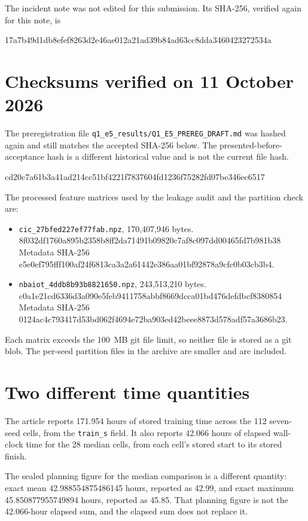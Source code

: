 \documentclass[11pt]{article}
\begin{document}
The incident note was not edited for this submission. Its SHA-256, verified again for this note, is

{\footnotesize\ttfamily 17a7b49d1db8efef8263d2e46ae012a21ad39b84ad63cc8dda3460423272534a}

\section{Checksums verified on 11 October 2026}
The preregistration file \texttt{q1\_e5\_results/Q1\_E5\_PREREG\_DRAFT.md} was hashed again and still matches the accepted SHA-256 below. The presented-before-acceptance hash is a different historical value and is not the current file hash.

{\footnotesize\ttfamily cd20c7a61b3a41ad214cc51bf4221f7837604fd1236f75282fd07be346ec6517}

The processed feature matrices used by the leakage audit and the partition check are:
\begin{itemize}
\item \texttt{cic\_27bfed227ef77fab.npz}, 170,407,946 bytes.\\
{\footnotesize\ttfamily 8f032df1760a895b2358b8ff2da71491b09820c7af8c097dd00465fd7b981b38}\\
Metadata SHA-256 {\footnotesize\ttfamily e5e0ef795fff100af24f6813ca3a2a61442e386aa01bf92878a9cfc0b03cb3b4}.
\item \texttt{nbaiot\_4ddb8b93b8821650.npz}, 243,513,210 bytes.\\
{\footnotesize\ttfamily c0a1e21cd6336d3a090e5feb9411758abbf8669dcca01bd476defdbcf8380854}\\
Metadata SHA-256 {\footnotesize\ttfamily 0124ac4c793417d53bd062f4694e72ba903ed42beee8873d578adf57a3686b23}.
\end{itemize}
Each matrix exceeds the 100~MB git file limit, so neither file is stored as a git blob. The per-seed partition files in the archive are smaller and are included.

\section{Two different time quantities}
The article reports 171.954 hours of stored training time across the 112 seven-seed cells, from the \texttt{train\_s} field. It also reports 42.066 hours of elapsed wall-clock time for the 28 median cells, from each cell's stored start to its stored finish.

The sealed planning figure for the median comparison is a different quantity: exact mean 42.988554875486145 hours, reported as 42.99, and exact maximum 45.850877955749894 hours, reported as 45.85. That planning figure is not the 42.066-hour elapsed sum, and the elapsed sum does not replace it.
\end{document}
